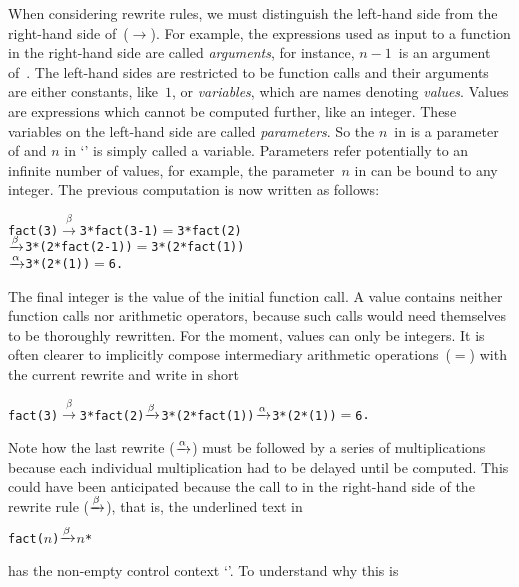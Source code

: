 When considering rewrite rules, we must distinguish the left\hyp{}hand
side from the right\hyp{}hand side of~(\(\rightarrow\)). For example,
the expressions used as input to a function in the right\hyp{}hand
side are called \emph{arguments}, for instance, \(n-1\)~is an argument
of~. The left\hyp{}hand sides are restricted to be
function calls and their arguments are either constants, like~\(1\),
or \emph{variables}, which are names denoting \emph{values}. Values
are expressions which cannot be computed further, like an
integer. These variables on the left\hyp{}hand side are called
\emph{parameters}. So the \(n\)~in  is a
parameter of  and \(n\) in
`' is simply called a
variable. Parameters refer potentially to an infinite number of
values, for example, the parameter~\(n\) in  can
be bound to any integer. The previous computation is now written as
follows:
\begin{alltt}
fact(3) \(\xrightarrow{\beta}\) 3 * fact(3-1)       \(=\) 3 * fact(2)
        \(\xrightarrow{\smash[t]{\beta}}\) 3 * (2 * fact(2-1)) \(=\) 3 * (2 * fact(1))
        \(\xrightarrow{\smash[t]{\alpha}}\) 3 * (2 * (1))       \(=\) 6\textrm{.}
\end{alltt}
The final integer is the value of the initial function call. A value
contains neither function calls nor arithmetic operators, because such
calls would need themselves to be thoroughly rewritten. For the
moment, values can only be integers. It is often clearer to implicitly
compose intermediary arithmetic operations~(\(=\)) with the current
rewrite and write in short
\begin{alltt}
fact(3) \(\xrightarrow{\beta}\) 3*fact(2) \(\xrightarrow{\smash[t]{\beta}}\) 3*(2*fact(1)) \(\xrightarrow{\smash[t]{\alpha}}\) 3*(2*(1)) \(=\) 6\textrm{.}
\end{alltt}
Note how the last rewrite (\(\xrightarrow{\smash[t]{\alpha}}\)) must be
followed by a series of multiplications~ because each
individual multiplication had to be delayed until  be
computed. This could have been anticipated because the call to
 in the right\hyp{}hand side of the rewrite rule
(\(\xrightarrow{\smash[t]{\beta}}\)), that is, the underlined text in
\begin{alltt}
fact(\(n\)) \(\xrightarrow{\smash[t]{\beta}}\) \(n\) * \underline{}
\end{alltt}
has the non\hyp{}empty control context
`'. To understand why this is
